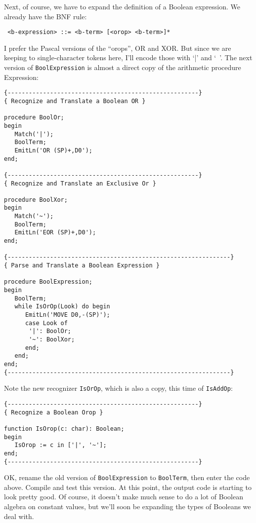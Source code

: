 Next, of course, we have to expand the definition  of  a  Boolean expression. We already have the BNF rule:

\begin{verbatim}
 <b-expression> ::= <b-term> [<orop> <b-term>]*
\end{verbatim}

I prefer the Pascal versions of the ``orops'', OR  and  XOR. But since we are keeping to single-character tokens here, I'll encode those with `|' and  `~'. The  next  version of {\tt BoolExpression} is almost a direct copy of the arithmetic procedure Expression:

\begin{verbatim}
{------------------------------------------------------}
{ Recognize and Translate a Boolean OR }

procedure BoolOr;
begin
   Match('|');
   BoolTerm;
   EmitLn('OR (SP)+,D0');
end;

{------------------------------------------------------}
{ Recognize and Translate an Exclusive Or }

procedure BoolXor;
begin
   Match('~');
   BoolTerm;
   EmitLn('EOR (SP)+,D0');
end;

{---------------------------------------------------------------}
{ Parse and Translate a Boolean Expression }

procedure BoolExpression;
begin
   BoolTerm;
   while IsOrOp(Look) do begin
      EmitLn('MOVE D0,-(SP)');
      case Look of
       '|': BoolOr;
       '~': BoolXor;
      end;
   end;
end;
{---------------------------------------------------------------}
\end{verbatim}

Note the new recognizer  {\tt IsOrOp}, which is also a copy, this time of {\tt IsAddOp}:

\begin{verbatim}
{------------------------------------------------------}
{ Recognize a Boolean Orop }

function IsOrop(c: char): Boolean;
begin
   IsOrop := c in ['|', '~'];
end;
{------------------------------------------------------}
\end{verbatim}

OK, rename the old  version  of {\tt  BoolExpression} to {\tt BoolTerm}, then enter  the  code  above. Compile and test this version. At this point, the  output  code  is  starting  to  look pretty good. Of course, it doesn't make much sense to do a lot of Boolean algebra on  constant values, but we'll soon be  expanding  the  types  of Booleans we deal with.

